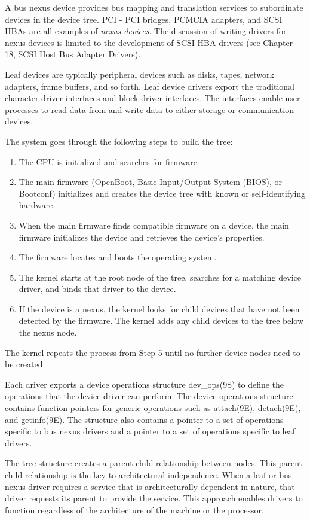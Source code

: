 \documentclass[11pt]{article}
\begin{document}
A bus nexus device provides bus mapping and translation services to subordinate
devices in the device tree. PCI - PCI bridges, PCMCIA adapters, and SCSI HBAs
are all examples of {\it nexus devices}. The discussion of writing drivers for
nexus devices is limited to the development of SCSI HBA drivers (see Chapter 18,
SCSI Host Bus Adapter Drivers).

Leaf devices are typically peripheral devices such as disks, tapes, network
adapters, frame buffers, and so forth. Leaf device drivers export the
traditional character driver interfaces and block driver interfaces. The
interfaces enable user processes to read data from and write data to either
storage or communication devices.

The system goes through the following steps to build the tree:

\begin{enumerate}
\item The CPU is initialized and searches for firmware.
\item The main firmware (OpenBoot, Basic Input/Output System (BIOS), or
  Bootconf) initializes and creates the device tree with known or
  self-identifying hardware.
\item When the main firmware finds compatible firmware on a device, the main
  firmware initializes the device and retrieves the device's properties.
\item The firmware locates and boots the operating system.
\item The kernel starts at the root node of the tree, searches for a matching
  device driver, and binds that driver to the device.
\item If the device is a nexus, the kernel looks for child devices that have
  not been detected by the firmware. The kernel adds any child devices to the
  tree below the nexus node.
\end{enumerate}

The kernel repeats the process from Step 5 until no further device nodes need to
be created.

Each driver exports a device operations structure dev\_ops(9S) to define the
operations that the device driver can perform. The device operations structure
contains function pointers for generic operations such as attach(9E),
detach(9E), and getinfo(9E). The structure also contains a pointer to a set of
operations specific to bus nexus drivers and a pointer to a set of operations
specific to leaf drivers.

The tree structure creates a parent-child relationship between nodes. This
parent-child relationship is the key to architectural independence. When a leaf
or bus nexus driver requires a service that is architecturally dependent in
nature, that driver requests its parent to provide the service. This approach
enables drivers to function regardless of the architecture of the machine or the
processor.
\end{document}

